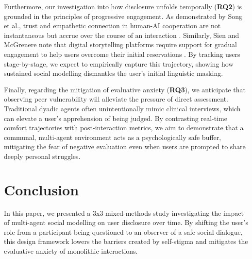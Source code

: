 \documentclass[sigconf]{acmart}
\begin{document}
Furthermore, our investigation into how disclosure unfolds temporally (\textbf{RQ2}) is grounded in the principles of progressive engagement. As demonstrated by Song et al., trust and empathetic connection in human-AI cooperation are not instantaneous but accrue over the course of an interaction \cite{Song2025Cooperation}. Similarly, Sien and McGrenere note that digital storytelling platforms require support for gradual engagement to help users overcome their initial reservations \cite{Sien2025DigitalHumanLibrary}. By tracking users stage-by-stage, we expect to empirically capture this trajectory, showing how sustained social modelling dismantles the user's initial linguistic masking.

Finally, regarding the mitigation of evaluative anxiety (\textbf{RQ3}), we anticipate that observing peer vulnerability will alleviate the pressure of direct assessment. Traditional dyadic agents often unintentionally mimic clinical interviews, which can elevate a user's apprehension of being judged. By contrasting real-time comfort trajectories with post-interaction metrics, we aim to demonstrate that a communal, multi-agent environment acts as a psychologically safe buffer, mitigating the fear of negative evaluation even when users are prompted to share deeply personal struggles.

\section{Conclusion}
In this paper, we presented a 3x3 mixed-methods study investigating the impact of multi-agent social modelling on user disclosure over time. By shifting the user's role from a participant being questioned to an observer of a safe social dialogue, this design framework lowers the barriers created by self-stigma and mitigates the evaluative anxiety of monolithic interactions.

\begin{acks}

\end{acks}

\appendix




\end{document}
